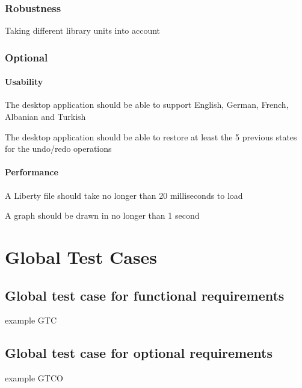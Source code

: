 \documentclass[10pt,a4paper]{report}
\begin{document}
\subsection{Robustness}
\begin{NFR-Rob}
    \item Taking different library units into account
\end{NFR-Rob}

\subsection{Optional}
\subsubsection{Usability}
\begin{NFRO-Usability}
    \item The desktop application should be able to support English, German, French, Albanian and Turkish
    \item The desktop application should be able to restore at least the 5 previous states for the undo/redo operations 
\end{NFRO-Usability}

\subsubsection{Performance}
\begin{NFRO-Perf}
    \item A Liberty file should take no longer than 20 milliseconds to load
    \item A graph should be drawn in no longer than 1 second
\end{NFRO-Perf}

\chapter{Global Test Cases}

\section{Global test case for functional requirements}
\begin{GTC}
    \item example GTC
\end{GTC}

\section{Global test case for optional requirements}
\begin{GTCO}
    \item example GTCO
\end{GTCO}
\end{document}

